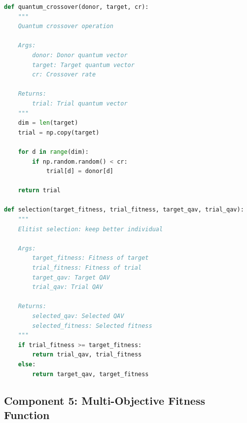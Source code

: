 \documentclass[12pt,a4paper]{article}
\begin{document}
\begin{lstlisting}[language=Python, caption=Quantum Crossover and Selection]
def quantum_crossover(donor, target, cr):
    """
    Quantum crossover operation
    
    Args:
        donor: Donor quantum vector
        target: Target quantum vector
        cr: Crossover rate
    
    Returns:
        trial: Trial quantum vector
    """
    dim = len(target)
    trial = np.copy(target)
    
    for d in range(dim):
        if np.random.random() < cr:
            trial[d] = donor[d]
    
    return trial

def selection(target_fitness, trial_fitness, target_qav, trial_qav):
    """
    Elitist selection: keep better individual
    
    Args:
        target_fitness: Fitness of target
        trial_fitness: Fitness of trial
        target_qav: Target QAV
        trial_qav: Trial QAV
    
    Returns:
        selected_qav: Selected QAV
        selected_fitness: Selected fitness
    """
    if trial_fitness >= target_fitness:
        return trial_qav, trial_fitness
    else:
        return target_qav, target_fitness
\end{lstlisting}

\subsection{Component 5: Multi-Objective Fitness Function}
\end{document}
